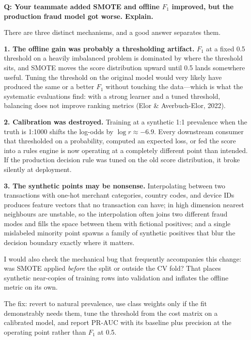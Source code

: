 \begin{interviewq}
\textbf{Q: Your teammate added SMOTE and offline $F_1$ improved, but the production fraud model got worse. Explain.}

 \quad {} \quad \badgefreq{\freqmed}

\stronganswer

There are three distinct mechanisms, and a good answer separates them.

\textbf{1. The offline gain was probably a thresholding artifact.} $F_1$ at a fixed 0.5 threshold on a heavily imbalanced problem is dominated by where the threshold sits, and SMOTE moves the score distribution upward until 0.5 lands somewhere useful. Tuning the threshold on the original model would very likely have produced the same or a better $F_1$ without touching the data---which is what the systematic evaluations find: with a strong learner and a tuned threshold, balancing does not improve ranking metrics (Elor \& Averbuch-Elor, 2022).

\textbf{2. Calibration was destroyed.} Training at a synthetic 1:1 prevalence when the truth is 1:1000 shifts the log-odds by $\log r \approx -6.9$. Every downstream consumer that thresholded on a probability, computed an expected loss, or fed the score into a rules engine is now operating at a completely different point than intended. If the production decision rule was tuned on the old score distribution, it broke silently at deployment.

\textbf{3. The synthetic points may be nonsense.} Interpolating between two transactions with one-hot merchant categories, country codes, and device IDs produces feature vectors that no transaction can have; in high dimension nearest neighbours are unstable, so the interpolation often joins two different fraud modes and fills the space between them with fictional positives; and a single mislabeled minority point spawns a family of synthetic positives that blur the decision boundary exactly where it matters.

I would also check the mechanical bug that frequently accompanies this change: was SMOTE applied \emph{before} the split or outside the CV fold? That places synthetic near-copies of training rows into validation and inflates the offline metric on its own.

The fix: revert to natural prevalence, use class weights only if the fit demonstrably needs them, tune the threshold from the cost matrix on a calibrated model, and report PR-AUC with its baseline plus precision at the operating point rather than $F_1$ at 0.5.


\end{interviewq}
